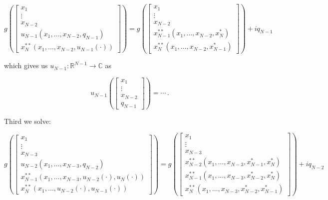 \documentclass[a4paper,10pt]{article}
\begin{document}
\begin{equation} \nonumber
 g\left(
 \begin{bmatrix}
  x_1 \\ \vdots \\ x_{N-2} \\ u_{N-1}(x_1, \ldots, x_{N-2}, q_{N-1}) \\ x_N^{**}(x_1, \ldots, x_{N-2}, u_{N-1}(\cdot))
 \end{bmatrix}
 \right)
 = g\left(
 \begin{bmatrix}
  x_1 \\ \vdots \\ x_{N-2} \\ x_{N-1}^{**}(x_1, \ldots, x_{N-2}, x_N^{*}) \\ x_{N}^{**}(x_1, \ldots, x_{N-2}, x_{N-1}^{*})
 \end{bmatrix}
 \right)
 +i q_{N-1}
\end{equation}

which gives us $u_{N-1}:\mathbb{R}^{N-1} \rightarrow \mathbb{C}$ as

\begin{equation} \nonumber
 u_{N-1}\left(
 \begin{bmatrix}
  x_1 \\ \vdots \\ x_{N-2} \\ q_{N-1}
 \end{bmatrix}
 \right) = \cdots \,.
\end{equation}

Third we solve:

\begin{equation} \nonumber
 g\left(
 \begin{bmatrix}
  x_1 \\ \vdots \\ x_{N-3} \\
  u_{N-2}(x_1, \ldots, x_{N-3}, q_{N-2}) \\
  x_{N-1}^{**}(x_1, \ldots, x_{N-3}, u_{N-2}(\cdot), u_{N}(\cdot)) \\
  x_N^{**}(x_1, \ldots, u_{N-2}(\cdot), u_{N-1}(\cdot))
 \end{bmatrix}
 \right)
 = g\left(
 \begin{bmatrix}
  x_1 \\ \vdots \\ x_{N-3} \\
  x_{N-2}^{**}(x_1, \ldots, x_{N-3}, x_{N-1}^{*}, x_N^{*}) \\
  x_{N-1}^{**}(x_1, \ldots, x_{N-3}, x_{N-2}^{*}, x_N^{*}) \\
  x_{N}^{**}  (x_1, \ldots, x_{N-3}, x_{N-2}^{*}, x_{N-1}^{*})
 \end{bmatrix}
 \right)
 +i q_{N-2}
\end{equation}
\end{document}
